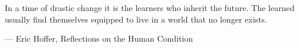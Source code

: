 \clearpage
\vspace*{\fill}
\epigraph{In a time of drastic change it is the learners who inherit the future. The learned usually find themselves equipped to live in a world that no longer exists.}{--- \textup{Eric Hoffer}, Reflections on the Human Condition}


\vspace*{\fill}



